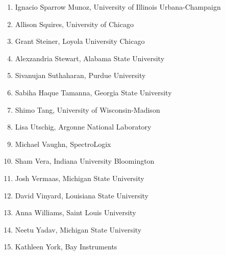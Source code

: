 \begin{multicols}{2}
\begin{enumerate}
\item Ignacio	Sparrow Munoz,	University of Illinois Urbana-Champaign
\item Allison	Squires,	University of Chicago
\item Grant	Steiner,	Loyola University Chicago
\item Alexzandria	Stewart,	Alabama State University
\item Sivanujan	Suthaharan,	Purdue University
\item Sabiha Haque	Tamanna,	Georgia State University
\item Shimo	Tang,	University of Wisconsin-Madison
\item Lisa	Utschig,	Argonne National Laboratory
\item Michael	Vaughn,	SpectroLogix
\item Sham	Vera,	Indiana University Bloomington 
\item Josh	Vermaas,	Michigan State University
\item David	Vinyard,	Louisiana State University
\item Anna	Williams,	Saint Louis University
\item Neetu	Yadav,	Michigan State University
\item Kathleen	York,	Bay Instruments
	\end{enumerate}
\end{multicols}